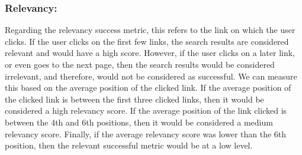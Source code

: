 \smallskip

\subsubsection*{Relevancy:}
Regarding the relevancy success metric, this refers to the link on which the user 
clicks. If the user clicks on the first few links, the search results are 
considered relevant and would have a high score. However, if the user clicks on a 
later link, or even goes to the next page, then the search results would be 
considered irrelevant, and therefore, would not be considered as successful. We 
can measure this based on the average position of the clicked link. If the average 
position of the clicked link is between the first three clicked links, then it 
would be considered a high relevancy score. If the average position of the link 
clicked is between the 4th and 6th positions, then it would be considered a medium 
relevancy score. Finally, if the average relevancy score was lower than the 6th 
position, then the relevant successful metric would be at a low level.